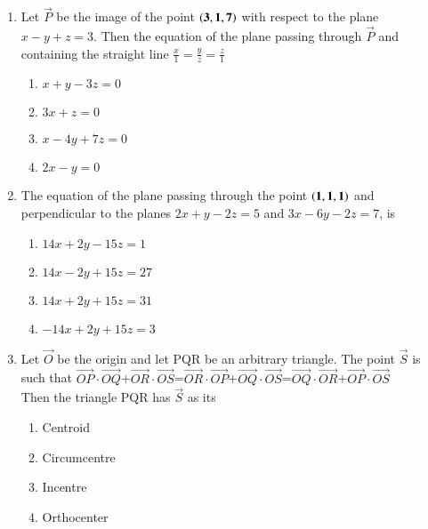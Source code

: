 \documentclass[journal,12pt,twocolumn]{IEEEtran}
\theoremstyle{remark}
\begin{document}
\begin{enumerate}
         \item %
		 Let $\vec{P}$ be the image of the point $\mathbf{\left(3,1,7\right)}$ with respect to the plane $x-y+z=3$. Then the equation of the plane passing through $\vec{P}$ and containing the straight line $\frac{x}{1}=\frac{y}{z}=\frac{z}{1}$ \hfill{}\\
\begin{enumerate}
        \item $x+y-3z=0$                             
        \item $3x+z=0$                           
        \item $x-4y+7z=0$            
        \item $2x-y=0$\\          
\end{enumerate}

         \item %
		 The equation of the plane passing through the point $\mathbf{\left(1,1,1\right)}$ and perpendicular to the planes $2x+y-2z=5$ and $3x-6y-2z=7$, is \hfill{}\\
\begin{enumerate}
        \item $14x+2y-15z=1$                             
        \item $14x-2y+15z=27$                           
        \item $14x+2y+15z=31$            
        \item $-14x+2y+15z=3$\\          
\end{enumerate}

         \item %
		 Let $\vec{O}$ be the origin and let PQR be an arbitrary triangle. The point $\vec{S}$ is such that $\vec{OP}\cdot\vec{OQ}$+$\vec{OR}\cdot\vec{OS}$=$\vec{OR}\cdot\vec{OP}$+$\vec{OQ}\cdot\vec{OS}$=$\vec{OQ}\cdot\vec{OR}$+$\vec{OP}\cdot\vec{OS}$\\
Then the triangle PQR has $\vec{S}$ as its \hfill{}\\
\begin{enumerate}
        \item Centroid                             
        \item Circumcentre                           
        \item Incentre            
        \item Orthocenter\\          
\end{enumerate}
\end{enumerate}
\end{document}
